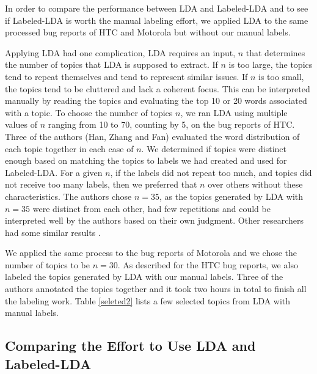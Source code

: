 \documentclass[10pt, conference, compsocconf]{IEEEtran}
\begin{document}



In order to compare the performance between LDA and Labeled-LDA and
 to see if Labeled-LDA is worth the manual labeling effort, 
we applied LDA to the same processed bug reports of HTC and Motorola
but without our manual labels. 

Applying LDA had one complication, LDA requires an input, $n$ that
determines the number of topics that LDA is supposed to extract. 
If $n$ is too large, the topics tend to repeat themselves and tend to
represent similar issues. 
If $n$ is too small, the topics tend to be cluttered and lack a
coherent focus.
This can be interpreted manually by reading the topics and evaluating
the top 10 or 20 words associated with a topic.
To choose the number of topics $n$, we ran LDA using multiple values
of $n$ ranging from 10 to 70, counting by 5,
on the bug reports of HTC. 
Three of the authors (Han, Zhang and Fan) evaluated the word distribution of each topic
together in each case of $n$. 
We determined if topics were distinct enough based on matching the
topics to labels we had created and used for Labeled-LDA. 
For a given $n$, if the labels did not repeat too much, and topics did not receive too
many labels, then we preferred that $n$ over others without these
characteristics.
The authors chose $n = 35$, as the topics generated by LDA with $n = 35$
were distinct from each other, had few repetitions and could be
interpreted well by the authors based on their own judgment.
Other researchers had some similar results
\cite{Thomas:2011,Hindle2011}. 

We applied the same process to the bug reports of Motorola and we chose
the number of topics to be $n = 30$. 
As described for the HTC bug reports, we also labeled the topics
generated by LDA with our manual labels.
Three of the authors annotated the topics together and it took two
hours in total to finish all the labeling work. 
Table \ref{seleted2} lists a few selected topics from LDA with manual labels.


\subsection{Comparing the Effort to Use LDA and Labeled-LDA}
\end{document}
